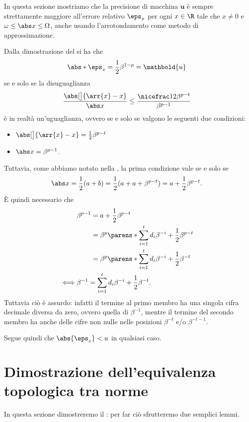 In questa sezione mostriamo che la precisione di macchina $\mathbold{u}$ è sempre strettamente maggiore all'errore relativo $\eps_x$ per ogni $x \in \R$ tale che $x \neq 0$ e $\omega \leq \abs x \leq \Omega$, anche usando l'arrotondamento come metodo di approssimazione.

Dalla dimostrazione del  si ha che \[
    \abs*{\eps_x} = \frac12\beta^{1-p} = \mathbold{u}
\] se e solo se la disuguaglianza \[
    \frac{\abs[\big]{\arr{x} - x}}{\abs x} 
    \leq \frac{\nicefrac12\beta^{p-t}}{\beta^{p-1}}
\] è in realtà un'uguaglianza, ovvero se e solo se valgono le seguenti due condizioni:
\begin{itemize}
    \item $\abs[\big]{\arr{x} - x} = \frac12\beta^{p-t}$
    \item $\abs x = \beta^{p-1}$.
\end{itemize}
Tuttavia, come abbiamo notato nella , la prima condizione vale se e solo se \[
    \abs x = \frac12(a+b) = \frac12(a + a + \beta^{p-t}) = a + \frac12\beta^{p-t}.
\] È quindi necessario che \begin{align*}
    &\beta^{p-1} 
        \begin{aligned}[t] 
            &= a + \frac12\beta^{p-t} \\
            &= \beta^p \parens*{\sum_{i=1}^t d_i\beta^{-i}} + \frac12\beta^{p-t} \\
            &= \beta^p \parens*{\sum_{i=1}^t d_i\beta^{-i} + \frac12\beta^{-t}}
        \end{aligned} \\
    \iff &\beta^{-1} = \sum_{i=1}^t d_i\beta^{-i} + \frac12\beta^{-t}.
\end{align*} Tuttavia ciò è assurdo: infatti il termine al primo membro ha una singola cifra decimale diversa da zero, ovvero quella di $\beta^{-1}$, mentre il termine del secondo membro ha anche delle cifre non nulle nelle posizioni $\beta^{-t}$ e/o $\beta^{-t-1}$.  

Segue quindi che $\abs{\eps_x} < u$ in qualsiasi caso.

\section{Dimostrazione dell'equivalenza topologica tra norme}
\label{sec:eq_topo_norm}

In questa sezione dimostreremo il : per far ciò sfrutteremo due semplici lemmi.

